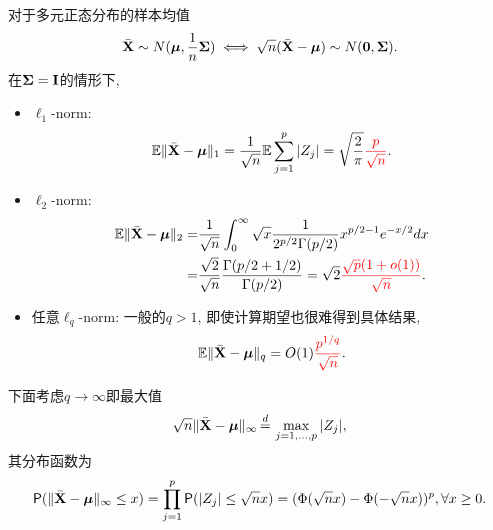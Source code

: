 对于多元正态分布的样本均值
\begin{align*}
	\bar{{\bf X}} \sim N(\mbox{\boldmath $\mu$}, \frac{1}{n}\mbox{\boldmath $\Sigma$}) \iff \sqrt{n} (\bar{{\bf X}}-\mbox{\boldmath $\mu$})\sim N(\bf{0}, \mbox{\boldmath $\Sigma$}).
\end{align*}	
在$\mbox{\boldmath $\Sigma$}={\bf I}$的情形下, 	
\begin{itemize}
	\item  $\ell_1$-norm:
	\begin{align*}
		\mathbb{E} \|\bar{{\bf X}}-\mbox{\boldmath $\mu$}\|_1=\frac{1}{\sqrt{n}} \mathbb{E} \sum_{j=1}^p |Z_j|= \sqrt{\frac{2}{\pi}} \textcolor{red}{\frac{p}{\sqrt{n}}}.
	\end{align*}
	\item  $\ell_2$-norm:
	\begin{align*}
		\mathbb{E} \|\bar{{\bf X}}-\mbox{\boldmath $\mu$}\|_2=&\frac{1}{\sqrt{n}} \int_0^\infty \sqrt{x}  \frac{1}{2^{p/2} \Gamma(p/2)} x^{p/2-1}e^{-x/2}dx\\
		=&\frac{\sqrt{2}}{\sqrt{n}} \frac{\Gamma(p/2+1/2)}{\Gamma(p/2)}=\sqrt{2} \textcolor{red}{\frac{\sqrt{p}(1+o(1))}{\sqrt{n}}}.
	\end{align*}
	\item 任意$\ell_q$-norm: 一般的$q>1$, 即使计算期望也很难得到具体结果, 
	\begin{align*}
		\mathbb{E} \|\bar{{\bf X}}-\mbox{\boldmath $\mu$}\|_q=O(1) \textcolor{red}{\frac{p^{1/q}}{\sqrt{n}}}.
	\end{align*} 
\end{itemize}

下面考虑$q \to \infty$即最大值	
\begin{align*}
	\sqrt{n} \|\bar{\X}-\bmu\|_\infty\indist \max_{j=1,\ldots,p} |Z_j|,
\end{align*}	
其分布函数为
\begin{align*}
	\textsf{P}(\|\bar{{\bf X}}-\mbox{\boldmath $\mu$}\|_\infty \leq x)=\prod_{j=1}^p \textsf{P}(|Z_j|\leq \sqrt{n} x)=(\Phi(\sqrt{n} x)-\Phi(-\sqrt{n} x))^p, \forall x \geq 0.
\end{align*}



